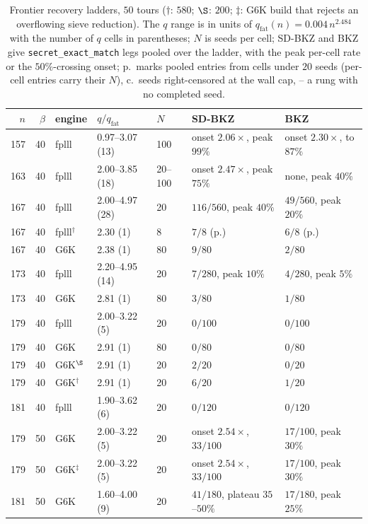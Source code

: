 \documentclass[journal=cic,version=preprint]{iacrj}
\begin{document}
\begin{table}[tbp]
\centering
\caption{Frontier recovery ladders, $50$ tours ($\dagger$: $580$; $\S$: $200$; $\ddagger$:
G6K build that rejects an overflowing sieve reduction). The $q$
range is in units of $q_\mathrm{fat}(n)=0.004\,n^{2.484}$ with the number of
$q$ cells in parentheses; $N$ is seeds per cell; SD-BKZ and BKZ give
\texttt{secret\_exact\_match} legs pooled over the ladder, with the peak per-cell
rate or the $50\%$-crossing onset; p.\ marks pooled entries from cells under
$20$ seeds (per-cell entries carry their $N$), c.\ seeds
right-censored at the wall cap, -- a rung with no completed seed.\label{tab:frontier}}
\scriptsize
\setlength{\tabcolsep}{2pt}
\begin{tabular}{rrlllll}
\toprule
$n$ & $\beta$ & engine & $q/q_\mathrm{fat}$ & $N$ & SD-BKZ & BKZ \\
\midrule
157 & 40 & fplll & 0.97--3.07 (13) & 100 & onset $2.06\times$, peak $99\%$ & onset $2.30\times$, to $87\%$ \\
163 & 40 & fplll & 2.00--3.85 (18) & 20--100 & onset $2.47\times$, peak $75\%$ & none, peak $40\%$ \\
167 & 40 & fplll & 2.00--4.97 (28) & 20 & $116/560$, peak $40\%$ & $49/560$, peak $20\%$ \\
167 & 40 & fplll$^\dagger$ & 2.30 (1) & 8 & $7/8$ (p.) & $6/8$ (p.) \\
167 & 40 & G6K & 2.38 (1) & 80 & $9/80$ & $2/80$ \\
173 & 40 & fplll & 2.20--4.95 (14) & 20 & $7/280$, peak $10\%$ & $4/280$, peak $5\%$ \\
173 & 40 & G6K & 2.81 (1) & 80 & $3/80$ & $1/80$ \\
179 & 40 & fplll & 2.00--3.22 (5) & 20 & $0/100$ & $0/100$ \\
179 & 40 & G6K & 2.91 (1) & 80 & $0/80$ & $0/80$ \\
179 & 40 & G6K$^\S$ & 2.91 (1) & 20 & $2/20$ & $0/20$ \\
179 & 40 & G6K$^\dagger$ & 2.91 (1) & 20 & $6/20$ & $1/20$ \\
181 & 40 & fplll & 1.90--3.62 (6) & 20 & $0/120$ & $0/120$ \\
\midrule
179 & 50 & G6K & 2.00--3.22 (5) & 20 & onset $2.54\times$, $33/100$ & $17/100$, peak $30\%$ \\
179 & 50 & G6K$^\ddagger$ & 2.00--3.22 (5) & 20 & onset $2.54\times$, $33/100$ & $17/100$, peak $30\%$ \\
181 & 50 & G6K & 1.60--4.00 (9) & 20 & $41/180$, plateau $35$--$50\%$ & $17/180$, peak $25\%$ \\

\end{tabular}
\end{table}
\end{document}
